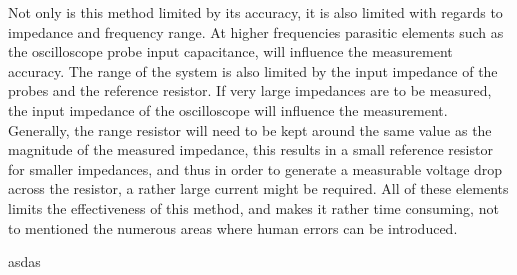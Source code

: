 Not only is this method limited by its accuracy, it is also limited with regards to impedance and frequency range. At higher frequencies parasitic elements such as the oscilloscope probe input capacitance, will influence the measurement accuracy. The range of the system is also limited by the input impedance of the probes and the reference resistor. If very large impedances are to be measured, the input impedance of the oscilloscope will influence the measurement. Generally, the range resistor will need to be kept around  the same value as the magnitude of the measured impedance, this results in a small reference resistor for smaller impedances, and thus in order to generate a measurable voltage drop across the resistor, a rather large current might be required. All of these elements limits the effectiveness of this method, and makes it rather time consuming, not to mentioned the numerous areas where human errors can be introduced.

asdas
